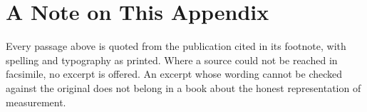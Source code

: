 \medskip

\section*{A Note on This Appendix}

Every passage above is quoted from the publication cited in its footnote, with spelling and typography as printed. Where a source could not be reached in facsimile, no excerpt is offered. An excerpt whose wording cannot be checked against the original does not belong in a book about the honest representation of measurement.

